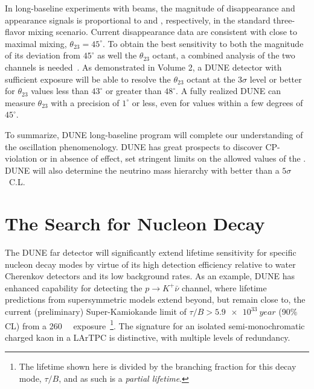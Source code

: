 In long-baseline experiments with \numu beams, the
magnitude of \numu disappearance and \nue appearance signals is
proportional to  and ,
respectively, in the standard three-flavor mixing scenario.  Current
\numu disappearance data are consistent with close to maximal
mixing, $\theta_{23} = 45^\circ$.  To obtain the best sensitivity to
both the magnitude of its deviation from $45^\circ$ as well the 
$\theta_{23}$ octant, a combined analysis of the two channels
is needed~\cite{Huber:2010dx}.  As demonstrated in Volume 2, a
 DUNE detector with sufficient exposure will be able to
resolve the $\theta_{23}$ octant at the $3\sigma$ level or better for
$\theta_{23}$ values less than $43^\circ$ or greater than $48^\circ$.
A fully realized DUNE can measure $\theta_{23}$ with a precision of
$1^\circ$ or less, even for values within a few degrees of
$45^\circ$. 

To summarize, DUNE long-baseline program will complete
our understanding of the oscillation phenomenology. 
DUNE has great prospects to discover CP-violation or in absence of
effect, set stringent limits on the allowed values of the \deltacp. 
DUNE will also determine the neutrino mass hierarchy with better
than a $5\sigma$~C.L.



\section{The Search for Nucleon Decay}

The DUNE far detector will significantly extend lifetime sensitivity
for specific nucleon decay modes by virtue of its high detection
efficiency relative to water Cherenkov detectors and its low
background rates.  As an example, DUNE has enhanced capability for
detecting the $p\to K^+\bar{\nu}$ channel, where lifetime
predictions from supersymmetric models extend beyond, but remain close
to, the current (preliminary) Super-Kamiokande limit of $\tau/B >
\SI{5.9e33}{year}$ (90\% CL) from a \SI[number-unit-product = -,
inter-unit-product=\ensuremath{{}\cdot{}}]{260}{\kt\year}
exposure~\cite{kearns_isoups}\footnote{The lifetime shown here is
  divided by the branching fraction for this decay mode, $\tau/B$, and
  as such is a \emph{partial lifetime}.}.  The signature for an
isolated semi-monochromatic charged kaon in a LArTPC is distinctive,
with multiple levels of redundancy. 

